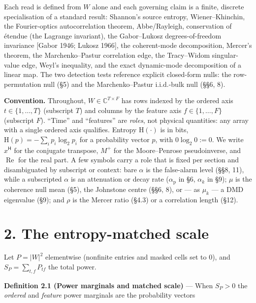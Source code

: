 \documentclass[10pt,letterpaper,twocolumn]{article}
\begin{document}
Each read is defined from \(W\) alone and each governing claim is a finite, discrete specialisation of a standard result: Shannon's source entropy, Wiener--Khinchin, the Fourier-optics autocorrelation theorem, Abbe/Rayleigh, conservation of étendue (the Lagrange invariant), the Gabor--Lukosz degrees-of-freedom invariance {[}Gabor 1946; Lukosz 1966{]}, the coherent-mode decomposition, Mercer's theorem, the Marchenko--Pastur correlation edge, the Tracy--Widom singular-value edge, Weyl's inequality, and the exact dynamic-mode decomposition of a linear map. The two detection tests reference explicit closed-form nulls: the row-permutation null (§5) and the Marchenko--Pastur i.i.d.-bulk null (§§6, 8).

\textbf{Convention.} Throughout, \(W\in\mathbb{C}^{T\times F}\) has rows indexed by the ordered axis \(t\in\{1,\dots,T\}\) (subscript \(T\)) and columns by the feature axis \(f\in\{1,\dots,F\}\) (subscript \(F\)). ``Time'' and ``features'' are \emph{roles}, not physical quantities: any array with a single ordered axis qualifies. Entropy \(\mathrm{H}(\cdot)\) is in bits, \(\mathrm{H}(p)=-\sum_i p_i\log_2 p_i\) for a probability vector \(p\), with \(0\log_2 0:=0\). We write \(x^{\mathsf H}\) for the conjugate transpose, \(M^{+}\) for the Moore--Penrose pseudoinverse, and \(\operatorname{Re}\) for the real part. A few symbols carry a role that is fixed per section and disambiguated by subscript or context: bare \(\alpha\) is the false-alarm level (§§8, 11), while a subscripted \(\alpha\) is an attenuation or decay rate (\(\alpha_{\mathrm p}\) in §6, \(\alpha_k\) in §9); \(\mu\) is the coherence null mean (§5), the Johnstone centre (§§6, 8), or --- as \(\mu_k\) --- a DMD eigenvalue (§9); and \(\rho\) is the Mercer ratio (§4.3) or a correlation length (§12).

\section{2. The entropy-matched scale}\label{2-the-entropy-matched-scale}

Let \(P=|W|^2\) elementwise (nonfinite entries and masked cells set to \(0\)), and \(S_{\!P}=\sum_{t,f}P_{tf}\) the total power.

\textbf{Definition 2.1 (Power marginals and matched scale)} --- When \(S_{\!P}>0\) the \emph{ordered} and \emph{feature} power marginals are the probability vectors

\end{document}
